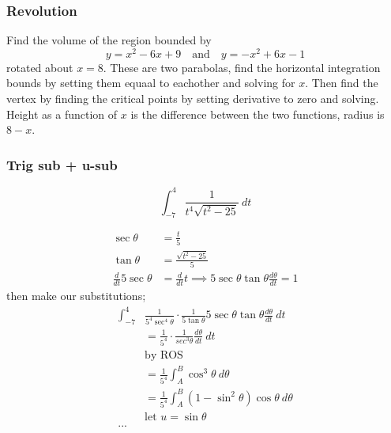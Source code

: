 \documentclass{article}
\begin{document}
\begin{multicols}{2}
\subsubsection*{Revolution}
Find the volume of the region bounded by
\[
	y = x^2 -6x +9 \quad \text{and} \quad y=-x^2 +6x -1
\]
rotated about $x=8$. These are two parabolas, find the horizontal integration bounds by setting them equaal to eachother and solving for $x$. Then find the vertex by finding the critical points by setting derivative to zero and solving. Height as a function of $x$ is the difference between the two functions, radius is $8 - x$.

\subsubsection*{Trig sub + u-sub}
\[
	\int_{-7}^{4} \frac{1}{t^4 \sqrt{t^2-25}}\ dt
\]

\begin{center}
\end{center}

\begin{align*}
	\sec \theta &= \frac{t}{5} \\
	\tan \theta &= \frac{\sqrt{t^2-25}}{5} \\
	\frac{d}{dt} 5 \sec \theta &= \frac{d}{dt} t \implies 5 \sec \theta \tan \theta \frac{d \theta}{dt} = 1
\end{align*}
then make our substitutions;
\begin{align*}
	\int_{-7}^{4} &\frac{1}{5^4 \sec^4 \theta} \cdot \frac{1}{5 \tan \theta} 5\sec\theta\tan\theta \frac{d \theta}{dt}\ dt \\
	&= \frac{1}{5^4} \cdot \frac{1}{sec^3 \theta} \frac{d \theta}{dt}\ dt \\
	& \text{by ROS} \\
	&= \frac{1}{5^4} \int_A^B \cos^3\theta\ d \theta \\
	&= \frac{1}{5^4} \int_A^B (1-\sin^2 \theta) \cos\theta\ d \theta \\
	&\text{let $u = \sin \theta$} \\
	...
\end{align*}



\end{multicols}
\end{document}
